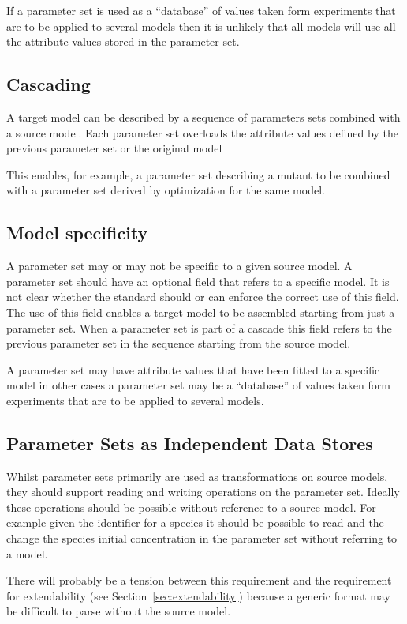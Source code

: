 \documentclass[10pt,twocolumntoc]{cekarticle}
\begin{document}
If a parameter set is used as a ``database'' of values taken form experiments that are to be
applied to several models then it is unlikely that all models will use all the attribute values
stored in the parameter set.

\subsection{Cascading}
\label{sec:cascading}
A target model can be described by a sequence of parameters sets combined with a source model.
Each parameter set overloads the attribute values defined by the previous parameter set or
the original model

This enables, for example, a parameter set describing a mutant to be combined with a parameter
set derived by optimization for the same model.

\subsection{Model specificity}
\label{specificity}
A parameter set may or may not be specific to a given source model.  A parameter set should
have an optional field that refers to a specific model.  It is not clear whether the standard
should or can enforce the correct use of this field.  The use of this field enables a target
model to be assembled starting from just a parameter set.  When a parameter set is part of a
cascade this field refers to the previous parameter set in the sequence starting from the
source model.

A parameter set may have attribute values that have been fitted to a specific model in other
cases a parameter set may be a ``database'' of values taken form experiments that are to be
applied to several models.

\subsection{Parameter Sets as Independent Data Stores}

Whilst parameter sets primarily are used as transformations on source models, they should support
reading and writing operations on the parameter set.  Ideally these operations should be possible
without reference to a source model.  For example given the identifier for a species it should be
possible to read and the change the species initial concentration in the parameter set without
referring to a model.

There will probably be a tension between this requirement and the requirement for extendability
(see Section~\ref{sec:extendability}) because a generic format may be difficult to parse without
the source model.
\end{document}

